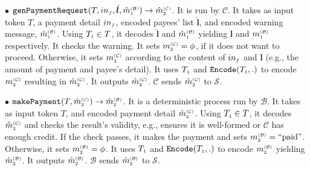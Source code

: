 \begin{definition}
%
\vspace{2mm}
\item  [$\bullet$] $\mathtt{genPaymentRequest}(T, in_{\scriptscriptstyle f}, \hat{\bm{l}}, \hat m^{\scriptscriptstyle\mathcal{(B)}}_{\scriptscriptstyle1})\rightarrow \hat m^{\scriptscriptstyle\mathcal{(C)}}_{\scriptscriptstyle2}$. It is  run by $\mathcal{C}$. It takes as input token $T$, a payment detail $in_{\scriptscriptstyle f}$, encoded payees' list $\hat{\bm{l}}$, and encoded warning message,  $\hat m^{\scriptscriptstyle\mathcal{(B)}}_{\scriptscriptstyle1}$. Using $T_{\scriptscriptstyle 1}\in T$, it decodes  $\hat{\bm{l}}$ and $\hat m^{\scriptscriptstyle\mathcal{(B)}}_{\scriptscriptstyle1}$ yielding ${\bm{l}}$ and $m^{\scriptscriptstyle\mathcal{(B)}}_{\scriptscriptstyle1}$ respectively. It checks the warning.  It sets   $m^{\scriptscriptstyle\mathcal{(C)}}_{\scriptscriptstyle2}=\phi$, if it does not want to proceed. Otherwise, it  sets $m^{\scriptscriptstyle\mathcal{(C)}}_{\scriptscriptstyle2}$ according to the content of $in_{\scriptscriptstyle f}$ and  ${\bm{l}}$ (e.g., the amount of payment and payee's detail). It uses $T_{\scriptscriptstyle 1}$ and  $\mathtt{Encode}(T_{\scriptscriptstyle 1}, .)$ to encode $m^{\scriptscriptstyle\mathcal{(C)}}_{\scriptscriptstyle2}$ resulting in $\hat m^{\scriptscriptstyle\mathcal{(C)}}_{\scriptscriptstyle2}$. It outputs $\hat m^{\scriptscriptstyle\mathcal{(C)}}_{\scriptscriptstyle2}$. $\mathcal{C}$ sends $\hat m^{\scriptscriptstyle\mathcal{(C)}}_{\scriptscriptstyle2}$ to $\mathcal{S}$. 
%
\vspace{2mm}
\item  [$\bullet$] $\mathtt{makePayment}(T, \hat m^{\scriptscriptstyle\mathcal{(C)}}_{\scriptscriptstyle2})\rightarrow \hat m^{\scriptscriptstyle\mathcal{(B)}}_{\scriptscriptstyle2}$. It is a deterministic process run by $\mathcal{B}$. It takes as input token $T$,  and encoded payment  detail $\hat m^{\scriptscriptstyle\mathcal{(C)}}_{\scriptscriptstyle2}$. Using $T_{\scriptscriptstyle 1}\in T$, it decodes $\hat m^{\scriptscriptstyle\mathcal{(C)}}_{\scriptscriptstyle2}$ and  checks the result's validity, e.g., ensures it is well-formed or $\mathcal{C}$ has enough credit. If the check  passes,  it makes the payment and  sets $m^{\scriptscriptstyle\mathcal{(B)}}_{\scriptscriptstyle2}=\text{``paid''}$. Otherwise, it sets $m^{\scriptscriptstyle\mathcal{(B)}}_{\scriptscriptstyle2}=\phi$. It uses $T_{\scriptscriptstyle 1}$ and  $\mathtt{Encode}(T_{\scriptscriptstyle 1}, .)$ to encode $m^{\scriptscriptstyle\mathcal{(B)}}_{\scriptscriptstyle2}$ yielding $\hat m^{\scriptscriptstyle\mathcal{(B)}}_{\scriptscriptstyle2}$. It outputs $\hat m^{\scriptscriptstyle\mathcal{(B)}}_{\scriptscriptstyle2}$. $\mathcal{B}$ sends $\hat m^{\scriptscriptstyle\mathcal{(B)}}_{\scriptscriptstyle2}$ to $\mathcal{S}$.
%
\vspace{2mm}

\end{definition}
